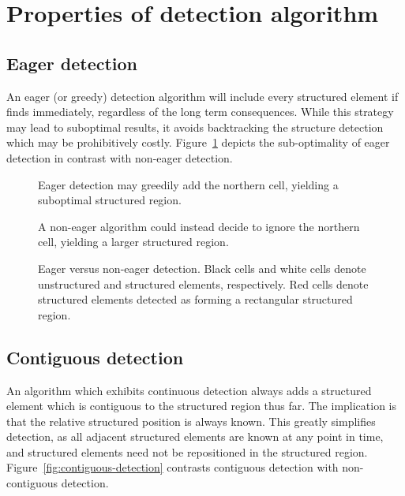 \section{Properties of detection algorithm}

\subsection{Eager detection}
An eager (or greedy) detection algorithm will include every structured element if finds immediately, regardless of the long term consequences. While this strategy may lead to suboptimal results, it avoids backtracking the structure detection which may be prohibitively costly. Figure~\ref{fig:eager-detection} depicts the sub-optimality of eager detection in contrast with non-eager detection.


\begin{figure}

\sidebyside
{
	\drawmatrix[cell wd=0.6, cell ht=0.6]{\eagermatrix}
	\caption{Eager detection may greedily add the northern cell, yielding a suboptimal structured region.}
}
{
	\drawmatrix[cell wd=0.6, cell ht=0.6]{\noneagermatrix}
	\caption{A non-eager algorithm could instead decide to ignore the northern cell, yielding a larger structured region.}
}
\caption{Eager versus non-eager detection. Black cells and white cells denote unstructured and structured elements, respectively. Red cells denote structured elements detected as forming a rectangular structured region.\label{fig:eager-detection}}
\end{figure}



\subsection{Contiguous detection}
An algorithm which exhibits continuous detection always adds a structured element which is contiguous to the structured region thus far. The implication is that the relative structured position is always known. This greatly simplifies detection, as all adjacent structured elements are known at any point in time, and structured elements need not be repositioned in the structured region. Figure~\ref{fig:contiguous-detection} contrasts contiguous detection with non-contiguous detection.

